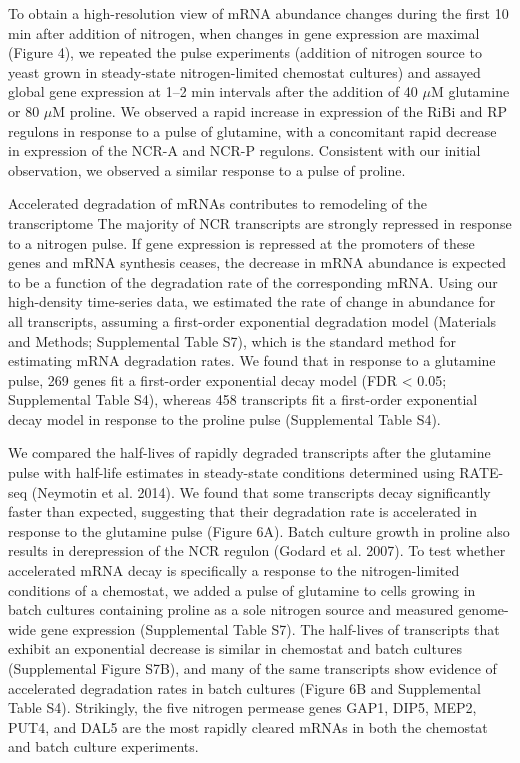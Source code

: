 To obtain a high-resolution view of mRNA abundance
changes during the first 10 min after addition of nitrogen, when
changes in gene expression are maximal (Figure 4), we repeated the
pulse experiments (addition of nitrogen source to yeast grown in
steady-state nitrogen-limited chemostat cultures) and assayed global
gene expression at 1–2 min intervals after the addition of 40 $\mu$M
glutamine or 80 $\mu$M proline. We observed a rapid increase in expression
of the RiBi and RP regulons in response to a pulse of glutamine, with
a concomitant rapid decrease in expression of the NCR-A and NCR-P
regulons. Consistent with our initial observation, we observed a
similar response to a pulse of proline. 

Accelerated degradation of
mRNAs contributes to remodeling of the transcriptome The majority of
NCR transcripts are strongly repressed in response to a nitrogen
pulse. If gene expression is repressed at the promoters of these genes
and mRNA synthesis ceases, the decrease in mRNA abundance is expected
to be a function of the degradation rate of the corresponding mRNA.
Using our high-density time-series data, we estimated the rate of
change in abundance for all transcripts, assuming a first-order
exponential degradation model (Materials and Methods; Supplemental
Table S7), which is the standard method for estimating mRNA
degradation rates. We found that in response to a glutamine pulse, 269
genes fit a first-order exponential decay model (FDR < 0.05;
Supplemental Table S4), whereas 458 transcripts fit a first-order
exponential decay model in response to the proline pulse (Supplemental
Table S4).  

We compared the half-lives of rapidly degraded transcripts
after the glutamine pulse with half-life estimates in steady-state
conditions determined using RATE-seq (Neymotin et al. 2014). We found
that some transcripts decay significantly faster than expected,
suggesting that their degradation rate is accelerated in response to
the glutamine pulse (Figure 6A). Batch culture growth in proline also
results in derepression of the NCR regulon (Godard et al. 2007). To
test whether accelerated mRNA decay is specifically a response to the
nitrogen-limited conditions of a chemostat, we added a pulse of
glutamine to cells growing in batch cultures containing proline as a
sole nitrogen source and measured genome-wide gene expression
(Supplemental Table S7). The half-lives of transcripts that exhibit an
exponential decrease is similar in chemostat and batch cultures
(Supplemental Figure S7B), and many of the same transcripts show
evidence of accelerated degradation rates in batch cultures (Figure 6B
and Supplemental Table S4). Strikingly, the five nitrogen permease
genes GAP1, DIP5, MEP2, PUT4, and DAL5 are the most rapidly cleared
mRNAs in both the chemostat and batch culture experiments.  

